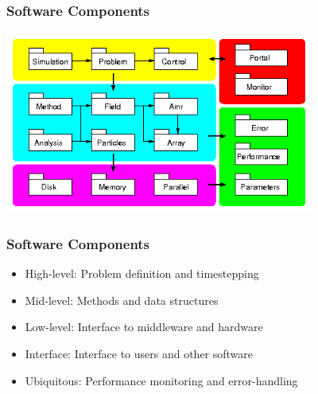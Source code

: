 \begin{frame}[fragile] \frametitle{Software Components}
\centerline{\includegraphics[width=4in]{components.png}}
\end{frame}
\begin{frame}[fragile] \frametitle{Software Components}
\begin{itemize}
\item \color{gray} High-level: Problem definition and timestepping
\item \color{cyan} Mid-level: Methods and data structures
\item \color{magenta} Low-level: Interface to middleware and hardware
\item \color{red} Interface: Interface to users and other software
\item \color{green} Ubiquitous: Performance monitoring and error-handling
\end{itemize}
\end{frame}